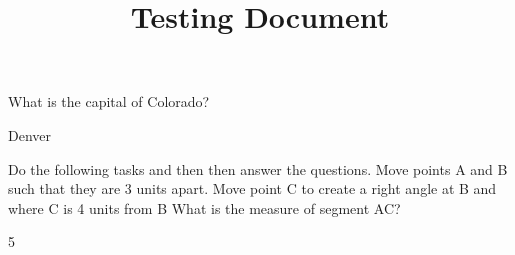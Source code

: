 \documentclass{ximera}
\title{Testing Document}
\begin{document}
\begin{question}
What is the capital of Colorado?
\begin{solution}
Denver
\end{solution}
\end{question}
\begin{question}
Do the following tasks and then then answer the questions.
Move points A and B such that they are 3 units apart.
Move point C to create a right angle at B and where C is 4 units from B
What is the measure of segment AC?
\begin{solution}
5
\end{solution}
\end{question}
\end{document}
